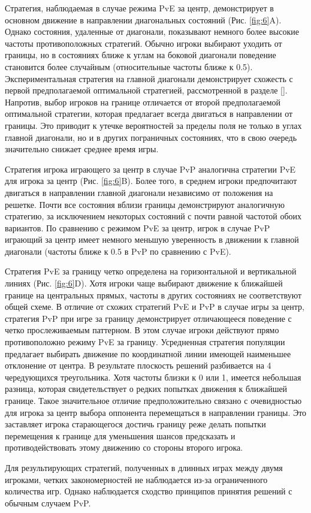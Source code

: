 Стратегия, наблюдаемая в случае режима PvE за центр, демонстрирует в основном движение в направлении диагональных состояний (Рис. \ref{fig:6}A). 
Однако состояния, удаленные от диагонали, показывают немного более высокие частоты противоположных стратегий. 
Обычно игроки выбирают уходить от границы, но в состояниях ближе к углам на боковой диагонали поведение становится более случайным 
(относительные частоты ближе к 0.5). Экспериментальная стратегия на главной диагонали демонстрирует схожесть с первой предполагаемой оптимальной стратегией, 
рассмотренной в разделе \cref{}. Напротив, выбор игроков на границе отличается от второй предполагаемой оптимальной стратегии, 
которая предлагает всегда двигаться в направлении от границы. Это приводит к утечке вероятностей за пределы поля не только в углах главной диагонали, 
но и в других пограничных состояниях, что в свою очередь значительно снижает среднее время игры. 

Стратегия игрока играющего за центр в случае PvP аналогична стратегии PvE для игрока за центр (Рис. \ref{fig:6}B). 
Более того, в среднем игроки предпочитают двигаться в направлении главной диагонали независимо от положения на решетке. 
Почти все состояния вблизи границы демонстрируют аналогичную стратегию, за исключением некоторых состояний с почти равной частотой обоих вариантов. 
По сравнению с режимом PvE за центр, игрок в случае PvP играющий за центр имеет немного меньшую уверенность в движении к главной диагонали 
(частоты ближе к 0.5 в PvP по сравнению с PvE).

Стратегия PvE за границу четко определена на горизонтальной и вертикальной линиях (Рис. \ref{fig:6}D). 
Хотя игроки чаще выбирают движение к ближайшей границе на центральных прямых, частоты в других состояниях не соответствуют общей схеме. 
В отличие от схожих стратегий PvE и PvP в случае игры за центр, стратегия PvP при игре за границу демонстрирует отличающееся поведение с четко прослеживаемым паттерном. 
В этом случае игроки действуют прямо противоположно режиму PvE за границу. Усредненная стратегия популяции предлагает выбирать движение 
по координатной линии имеющей наименьшее отклонение от центра. В результате плоскость решений разбивается на 4 чередующихся треугольника. 
Хотя частоты близки к 0 или 1, имеется небольшая разница, которая свидетельствует о редких попытках движения к ближайшей границе.
Такое значительное отличие предположительно связано с очевидностью для игрока за центр выбора оппонента перемещаться в направлении границы.
Это заставляет игрока старающегося достичь границу реже делать попытки перемещения к границе для уменьшения шансов предсказать и противодействовать этому движению
со стороны второго игрока.

Для результирующих стратегий, полученных в длинных играх между двумя игроками, четких закономерностей не наблюдается из-за ограниченного количества игр. 
Однако наблюдается сходство принципов принятия решений с обычным случаем PvP.

